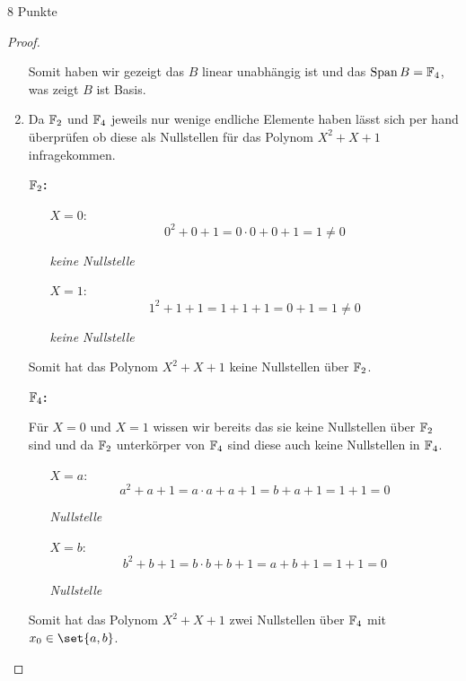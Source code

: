 \documentclass{problemset}
\begin{document}
\begin{problem}{8 Punkte}
\begin{proof}
\begin{enumerate}
              Somit haben wir gezeigt das $B$ linear unabhängig ist und das
              $\operatorname{Span} B = \mathbb{F}_4$, was zeigt $B$ ist Basis.
        \item Da $\mathbb{F}_2$ und $\mathbb{F}_4$ jeweils nur wenige endliche
              Elemente haben lässt sich per hand überprüfen ob diese als
              Nullstellen für das Polynom $X^2 + X + 1$ infragekommen.

              \textbf{$\mathbb{F}_2$:}
              \begin{itemize}
                  \item [$X = 0$:]
                        \[
                            0^2 + 0 + 1 = 0 \cdot 0 + 0 + 1 = 1 \neq 0
                        \]

                        \textit{keine Nullstelle}

                  \item [$X = 1$:]
                        \[
                            1^2 + 1 + 1 = 1 + 1 + 1 = 0 + 1 = 1 \neq 0
                        \]

                        \textit{keine Nullstelle}

              \end{itemize}

              Somit hat das Polynom $X^2 + X + 1$ keine Nullstellen über
              $\mathbb{F}_2$.

              \textbf{$\mathbb{F}_4$:}

              Für $X = 0$ und $X = 1$ wissen wir bereits das sie keine
              Nullstellen über $\mathbb{F}_2$ sind und da $\mathbb{F}_2$
              unterkörper von $\mathbb{F}_4$ sind diese auch keine Nullstellen
              in $\mathbb{F}_4$.
              \begin{itemize}
                  \item [$X = a$:]
                        \[
                            a^2 + a + 1 = a \cdot a + a + 1 = b + a + 1 = 1 + 1 = 0
                        \]

                        \textit{Nullstelle} \checkmark

                  \item [$X = b$:]
                        \[
                            b^2 + b + 1 = b \cdot b + b + 1 = a + b + 1 = 1 + 1 = 0
                        \]

                        \textit{Nullstelle} \checkmark

              \end{itemize}

              Somit hat das Polynom $X^2 + X + 1$ zwei Nullstellen über
              $\mathbb{F}_4$ mit $x_0 \in \set{a,b}$.
    \end{enumerate}
\end{proof}
\end{problem}
\end{document}
